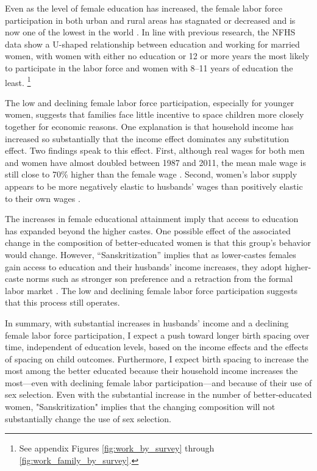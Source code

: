 Even as the level of female education has increased, the female labor force participation 
in both urban and rural areas has stagnated or decreased and is now one of 
the lowest in the world
\citep{Klasen2015,Fletcher2017,Afridi2018,Bhargava2018,Chatterjee2018,Bhargava2019}.
In line with previous research, the NFHS data show a U-shaped relationship between 
education and working for married women, with women with either no education or 12 or more 
years the most likely to participate in the labor force and women with 8--11 years of 
education the least.%
\footnote{
See appendix Figures \ref{fig:work_by_survey} through \ref{fig:work_family_by_survey}. 
}

The low and declining female labor force participation, especially for younger women, 
suggests that families face little incentive to space children more closely 
together for economic reasons.
One explanation is that household income has increased so substantially that the income 
effect dominates any substitution effect.
Two findings speak to this effect.
First, although real wages for both men and women have almost doubled between 1987 and 
2011, the mean male wage is still close to 70\% higher than the female wage 
\citep{Klasen2015,Bhargava2018}.
Second, women’s labor supply appears to be more negatively elastic to husbands' 
wages than positively elastic to their own wages \citep{Bhargava2018}.


The increases in female educational attainment imply that access to education has 
expanded beyond the higher castes. 
One possible effect of the associated change in the composition of better-educated women 
is that this group's behavior would change.
However, ``Sanskritization'' implies that as lower-castes females gain access to 
education and their husbands' income increases, they adopt higher-caste 
norms such as stronger son preference and a retraction from the formal labor 
market \citep{Srinivas1956,Chen1995,Abraham2013,Chatterjee2018}.
The low and declining female labor force participation suggests that this process still operates.


In summary, with substantial increases in husbands' income and a declining female labor 
force participation, I expect a push toward longer birth spacing over time, independent
of education levels, based on the income effects and the effects of spacing
on child outcomes.
Furthermore, I expect birth spacing to increase the most among the better educated 
because their household income increases the most---even with declining female labor 
participation---and because of their use of sex selection.
Even with the substantial increase in the number of better-educated women, 
"Sanskritization" implies that the changing composition will not substantially change 
the use of sex selection.






